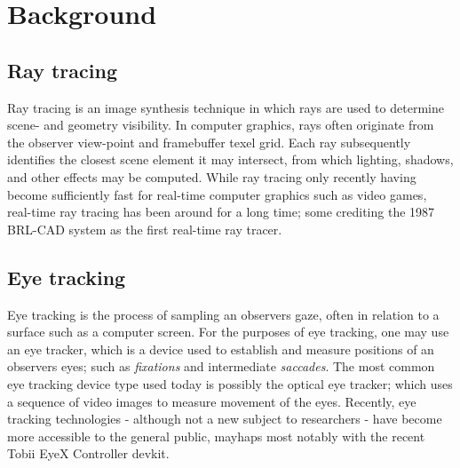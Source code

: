 \section{Background}
\subsection{Ray tracing}
Ray tracing is an image synthesis technique in which rays are used to determine scene- and geometry visibility.
In computer graphics, rays often originate from the observer view-point and framebuffer texel grid.
Each ray subsequently identifies the closest scene element it may intersect, from which lighting, shadows, and other effects may be computed.
While ray tracing only recently having become sufficiently fast for real-time computer graphics such as video games, real-time ray tracing has been around for a long time; some crediting the 1987 BRL-CAD system as the first real-time ray tracer\cite{stay87}.


\subsection{Eye tracking}
Eye tracking is the process of sampling an observers gaze, often in relation to a surface such as a computer screen.
For the purposes of eye tracking, one may use an eye tracker, which is a device used to establish and measure positions of an observers eyes\cite{duchowski07}; such as \textit{fixations} and intermediate \textit{saccades}\cite{rayner98}.
The most common eye tracking device type used today is possibly the optical eye tracker; which uses a sequence of video images to measure movement of the eyes\cite{duchowski07}.
Recently, eye tracking technologies - although not a new subject to researchers - have become more accessible to the general public, mayhaps most notably with the recent Tobii EyeX Controller devkit.

